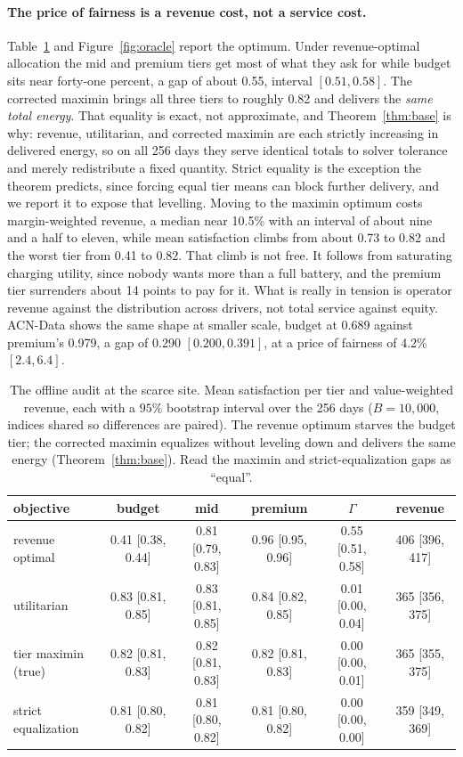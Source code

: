 \documentclass[manuscript, screen, review, anonymous]{acmart}
\begin{document}
\paragraph{The price of fairness is a revenue cost, not a service cost.}
Table~\ref{tab:oracle} and Figure~\ref{fig:oracle} report the optimum. Under revenue-optimal allocation the mid and premium tiers get most of what they ask for while budget sits near forty-one percent, a gap of about 0.55, interval $[0.51, 0.58]$. The corrected maximin brings all three tiers to roughly 0.82 and delivers the \emph{same total energy}. That equality is exact, not approximate, and Theorem~\ref{thm:base} is why: revenue, utilitarian, and corrected maximin are each strictly increasing in delivered energy, so on all 256 days they serve identical totals to solver tolerance and merely redistribute a fixed quantity. Strict equality is the exception the theorem predicts, since forcing equal tier means can block further delivery, and we report it to expose that levelling. Moving to the maximin optimum costs margin-weighted revenue, a median near 10.5\% with an interval of about nine and a half to eleven, while mean satisfaction climbs from about 0.73 to 0.82 and the worst tier from 0.41 to 0.82. That climb is not free. It follows from saturating charging utility, since nobody wants more than a full battery, and the premium tier surrenders about 14 points to pay for it. What is really in tension is operator revenue against the distribution across drivers, not total service against equity. ACN-Data shows the same shape at smaller scale, budget at 0.689 against premium's 0.979, a gap of 0.290 $[0.200, 0.391]$, at a price of fairness of 4.2\% $[2.4, 6.4]$.

\begin{table}[t]
\centering
\small
\setlength{\tabcolsep}{3.5pt}
\caption{The offline audit at the scarce site. Mean satisfaction per tier and value-weighted revenue, each with a $95\%$ bootstrap interval over the 256 days ($B=10{,}000$, indices shared so differences are paired). The revenue optimum starves the budget tier; the corrected maximin equalizes without leveling down and delivers the same energy (Theorem~\ref{thm:base}). Read the maximin and strict-equalization gaps as ``equal''.}
\label{tab:oracle}
\begin{tabular}{lccccc}
\toprule
objective & budget & mid & premium & $\Gamma$ & revenue \\
\midrule
revenue optimal     & 0.41 [0.38, 0.44] & 0.81 [0.79, 0.83] & 0.96 [0.95, 0.96] & 0.55 [0.51, 0.58] & 406 [396, 417] \\
utilitarian         & 0.83 [0.81, 0.85] & 0.83 [0.81, 0.85] & 0.84 [0.82, 0.85] & 0.01 [0.00, 0.04] & 365 [356, 375] \\
tier maximin (true) & 0.82 [0.81, 0.83] & 0.82 [0.81, 0.83] & 0.82 [0.81, 0.83] & 0.00 [0.00, 0.01] & 365 [355, 375] \\
strict equalization & 0.81 [0.80, 0.82] & 0.81 [0.80, 0.82] & 0.81 [0.80, 0.82] & 0.00 [0.00, 0.00] & 359 [349, 369] \\
\bottomrule
\end{tabular}
\end{table}
\end{document}
